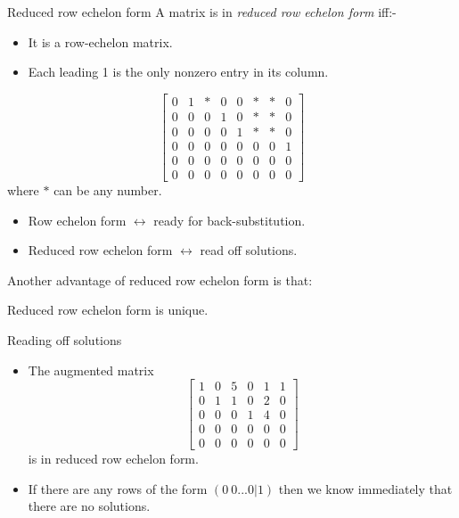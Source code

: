 \documentclass{beamer}
\begin{document}
\begin{frame}{Reduced row echelon form}
  A matrix is in \emph{reduced row echelon form} iff:-
  \begin{itemize}
  \item It is a row-echelon matrix.
  \item Each leading 1 is the only nonzero entry in its
    column.
  \end{itemize}
  \begin{equation*}
      \left[\begin{array}{rrrrrrrr}
              0 & 1 & * & 0 & 0 & * & * & 0 \\
              0 & 0 & 0 & 1 & 0 & * & * & 0 \\
              0 & 0 & 0 & 0 & 1 & * & * & 0 \\
              0 & 0 & 0 & 0 & 0 & 0 & 0 & 1 \\
              0 & 0 & 0 & 0 & 0 & 0 & 0 & 0 \\
              0 & 0 & 0 & 0 & 0 & 0 & 0 & 0 
            \end{array}\right] 
        \end{equation*}
        where $*$ can be any number.
\end{frame}

\begin{frame}
  \begin{itemize}
  \item Row echelon form $\leftrightarrow$ ready for back-substitution.\vfill
  \item Reduced row echelon form $\leftrightarrow$ read off solutions.
  \end{itemize}\vfill
  Another advantage of reduced row echelon form is that:\vfill
  \begin{theorem}
    Reduced row echelon form is unique.
  \end{theorem}
\end{frame}

\begin{frame}{Reading off solutions}
  \begin{itemize}
  \item   The augmented matrix
    \begin{equation*}
      \left[\begin{array}{rrrrr|r}
               1 & 0 & 5 & 0 & 1 &1 \\
               0 & 1 & 1 & 0 & 2 &0 \\
               0 & 0 & 0 & 1 & 4 &0 \\
               0 & 0 & 0 & 0 & 0 &0\\
               0 & 0 & 0 & 0 & 0 &0
            \end{array}\right] 
        \end{equation*}
        is in reduced row echelon form.\vfill
      \item If there are any rows of the form $(0~ 0...0|1)$ then we know immediately that there are no solutions.
  \end{itemize}
\end{frame}
\end{document}
